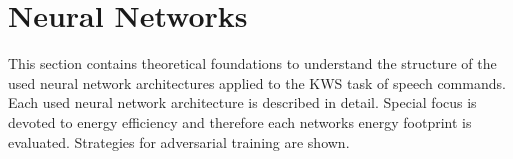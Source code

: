 
\chapter{Neural Networks}\label{sec:nn}
This section contains theoretical foundations to understand the structure of the used neural network architectures applied to the KWS task of speech commands.
Each used neural network architecture is described in detail.
Special focus is devoted to energy efficiency and therefore each networks energy footprint is evaluated.
Strategies for adversarial training are shown.





